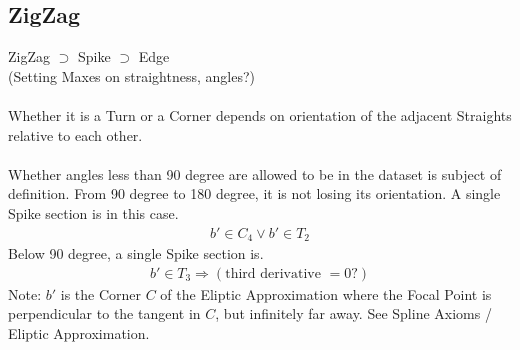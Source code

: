 \documentclass{report}
\begin{document}
\subsection{ZigZag}
ZigZag $\supset$ Spike $\supset$ Edge\\
(Setting Maxes on straightness, angles?)\\\\
Whether it is a Turn or a Corner depends on orientation of the adjacent Straights relative to each other.\\\\
Whether angles less than 90 degree are allowed to be in the dataset is subject of definition.
From 90 degree to 180 degree, it is not losing its orientation. A single Spike section is in this case.
\begin{align}
b' \in C_{4} \lor b' \in T_{2}
\end{align}
Below 90 degree, a single Spike section is.
\begin{align}
b' \in T_{3} \Rightarrow (\text{third derivative }= 0?)
\end{align}
Note: $b'$ is the Corner $C$ of the Eliptic Approximation where the Focal Point is perpendicular to the tangent in $C$, but infinitely far away. See Spline Axioms / Eliptic Approximation.
\end{document}
